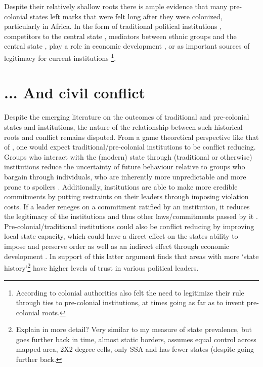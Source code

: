 \documentclass[12pt]{article}
\begin{document}
Despite their relatively shallow roots there is ample evidence that many
pre-colonial states left marks that were felt long after they were colonized,
particularly in Africa. In the form of traditional political institutions
\citep{Beall_2005, Holzinger_2020, Neupert_Wentz_2021, Ubink_2008}, competitors
to the central state \citep{Herbst2014}, mediators between ethnic groups and the
central state \citep{boone2014property, Englebert2002}, play a role in economic
development \citep{Michalopoulos2018, Acemoglu2014, Gennaioli2007,
Bockstette2002}, or as important sources of legitimacy for current
	institutions \citep{Wig2016}\footnote{According to
		\citet{mamdani2018citizen} colonial authorities also felt the
	need to legitimize their rule through ties to pre-colonial institutions,
at times going as far as to invent pre-colonial roots.}.

\section{... And civil conflict}

Despite the emerging literature on the outcomes of traditional and pre-colonial
states and institutions, the nature of the relationship between such historical
roots and conflict remains disputed. From a game theoretical perspective like
that of \citet{Fearon1995}, one would expect traditional/pre-colonial
institutions to be conflict reducing. Groups who interact with the (modern)
state through (traditional or otherwise) institutions reduce the uncertainty of
future behaviour relative to groups who bargain through individuals, who are
inherently more unpredictable and more prone to spoilers \citep{Wig2016}.
Additionally, institutions are able to make more credible commitments by putting
restraints on their leaders through imposing violation costs. If a leader
reneges on a commitment ratified by an institution, it reduces the legitimacy of
the institutions and thus other laws/commitments passed by it \citep{Wig2016}.
Pre-colonial/traditional institutions could also be conflict reducing by
improving local state capacity, which could have a direct effect on the states
ability to impose and preserve order as well as an indirect effect through
economic development \citep{Depetris-Chauvin2016}. In support of this latter
argument \citet{Depetris-Chauvin2016} finds that areas with more `state
history'\footnote{Explain in more detail? Very similar to my measure of state
	prevalence, but goes further back in time, almost static borders,
assumes equal control across mapped area, 2X2 degree cells, only SSA and has
fewer states (despite going further back.} have higher levels of trust in
various political leaders.
\end{document}
